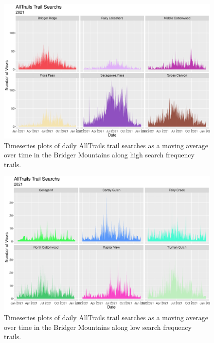 \documentclass[
]{book}
\begin{document}
\begin{figure}

{\centering \includegraphics[width=1\linewidth]{../figures/allTrails_search_TS_high} 

}

\caption{Timeseries plots of daily AllTrails trail searches as a moving average over time in the Bridger Mountains along high search frequency trails.}\label{fig:alltrails-bytrailname-high}
\end{figure}

\begin{figure}

{\centering \includegraphics[width=1\linewidth]{../figures/allTrails_search_TS_low} 

}

\caption{Timeseries plots of daily AllTrails trail searches as a moving average over time in the Bridger Mountains along low search frequency trails.}\label{fig:alltrails-bytrailname-low}
\end{figure}
\end{document}
